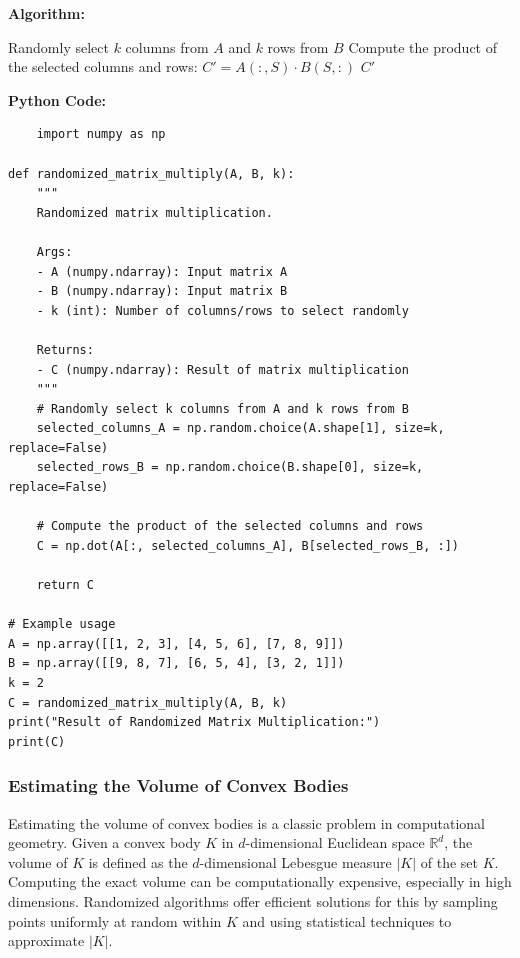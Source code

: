 \documentclass[12pt]{book} %
\begin{document}
\textbf{Algorithm:}
\FloatBarrier
\begin{algorithm}[H]
\caption{Randomized Matrix Multiplication}
\begin{algorithmic}[1]
    \State Randomly select \(k\) columns from \(A\) and \(k\) rows from \(B\)
    \State Compute the product of the selected columns and rows: \(C' = A(:, S) \cdot B(S, :)\)
    \State \Return \(C'\)
\EndProcedure
\end{algorithmic}
\end{algorithm}
\FloatBarrier
\textbf{Python Code:}
\FloatBarrier
\begin{lstlisting}
    import numpy as np

def randomized_matrix_multiply(A, B, k):
    """
    Randomized matrix multiplication.

    Args:
    - A (numpy.ndarray): Input matrix A
    - B (numpy.ndarray): Input matrix B
    - k (int): Number of columns/rows to select randomly

    Returns:
    - C (numpy.ndarray): Result of matrix multiplication
    """
    # Randomly select k columns from A and k rows from B
    selected_columns_A = np.random.choice(A.shape[1], size=k, replace=False)
    selected_rows_B = np.random.choice(B.shape[0], size=k, replace=False)

    # Compute the product of the selected columns and rows
    C = np.dot(A[:, selected_columns_A], B[selected_rows_B, :])

    return C

# Example usage
A = np.array([[1, 2, 3], [4, 5, 6], [7, 8, 9]])
B = np.array([[9, 8, 7], [6, 5, 4], [3, 2, 1]])
k = 2
C = randomized_matrix_multiply(A, B, k)
print("Result of Randomized Matrix Multiplication:")
print(C)
\end{lstlisting}

\subsubsection{Estimating the Volume of Convex Bodies}
Estimating the volume of convex bodies is a classic problem in computational geometry. Given a convex body \(K\) in \(d\)-dimensional Euclidean space \(\mathbb{R}^d\), the volume of \(K\) is defined as the \(d\)-dimensional Lebesgue measure \(|K|\) of the set \(K\). Computing the exact volume can be computationally expensive, especially in high dimensions. Randomized algorithms offer efficient solutions for this by sampling points uniformly at random within \(K\) and using statistical techniques to approximate \(|K|\).
\end{document}
